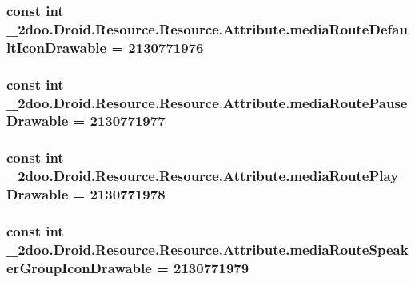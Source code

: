 \hypertarget{class__2doo_1_1_droid_1_1_resource_1_1_attribute_2868b96d7a832f2c94f0475aa2ef6c0c}{
\subsubsection[{mediaRouteDefaultIconDrawable}]{\setlength{\rightskip}{0pt plus 5cm}const int \_\-2doo.Droid.Resource.Resource.Attribute.mediaRouteDefaultIconDrawable = 2130771976}}
\label{class__2doo_1_1_droid_1_1_resource_1_1_attribute_2868b96d7a832f2c94f0475aa2ef6c0c}


\hypertarget{class__2doo_1_1_droid_1_1_resource_1_1_attribute_9a828b725b719b16c72543442db7efe5}{
\subsubsection[{mediaRoutePauseDrawable}]{\setlength{\rightskip}{0pt plus 5cm}const int \_\-2doo.Droid.Resource.Resource.Attribute.mediaRoutePauseDrawable = 2130771977}}
\label{class__2doo_1_1_droid_1_1_resource_1_1_attribute_9a828b725b719b16c72543442db7efe5}


\hypertarget{class__2doo_1_1_droid_1_1_resource_1_1_attribute_d597887e02f40f6030ab2e16287cca06}{
\subsubsection[{mediaRoutePlayDrawable}]{\setlength{\rightskip}{0pt plus 5cm}const int \_\-2doo.Droid.Resource.Resource.Attribute.mediaRoutePlayDrawable = 2130771978}}
\label{class__2doo_1_1_droid_1_1_resource_1_1_attribute_d597887e02f40f6030ab2e16287cca06}


\hypertarget{class__2doo_1_1_droid_1_1_resource_1_1_attribute_000a79dc25fc51473a8c0277de7bb8ef}{
\subsubsection[{mediaRouteSpeakerGroupIconDrawable}]{\setlength{\rightskip}{0pt plus 5cm}const int \_\-2doo.Droid.Resource.Resource.Attribute.mediaRouteSpeakerGroupIconDrawable = 2130771979}}
\label{class__2doo_1_1_droid_1_1_resource_1_1_attribute_000a79dc25fc51473a8c0277de7bb8ef}


